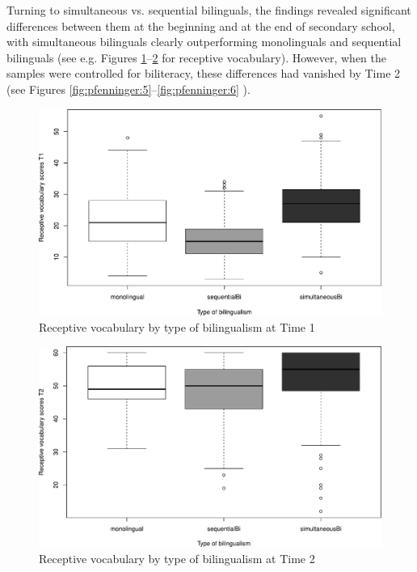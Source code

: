 \documentclass[output=paper,modfonts,nonflat,newtxmath]{langsci/langscibook}
\begin{document}
Turning to simultaneous vs. sequential bilinguals, the findings revealed significant differences between them at the beginning and at the end of secondary school, with simultaneous bilinguals clearly outperforming monolinguals and sequential bilinguals (see e.g. Figures \ref{fig:pfenninger:3}--\ref{fig:pfenninger:4} for receptive vocabulary). However, when the samples were controlled for biliteracy, these differences had vanished by Time 2 (see Figures \ref{fig:pfenninger:5}--\ref{fig:pfenninger:6} ).%

\begin{figure} %
\includegraphics[width=.75\textwidth]{figures/PfenningerFigure3.pdf}
\caption{\label{fig:pfenninger:3}Receptive vocabulary by type of bilingualism at Time 1}
\end{figure}

\begin{figure} %
\includegraphics[width=.75\textwidth]{figures/PfenningerFigure4.pdf}
\caption{\label{fig:pfenninger:4}Receptive vocabulary by type of bilingualism at Time 2}
\end{figure}
\end{document}
